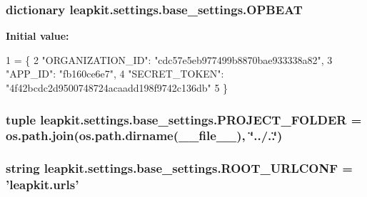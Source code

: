 \hypertarget{namespaceleapkit_1_1settings_1_1base__settings_a741fb2801950e7f83ca6019995d8f4c7}{
\subsubsection[{O\-P\-B\-E\-A\-T}]{\setlength{\rightskip}{0pt plus 5cm}dictionary leapkit.\-settings.\-base\-\_\-settings.\-O\-P\-B\-E\-A\-T}}\label{namespaceleapkit_1_1settings_1_1base__settings_a741fb2801950e7f83ca6019995d8f4c7}
{\bfseries Initial value\-:}
\begin{DoxyCode}
1 = \{
2     \textcolor{stringliteral}{"ORGANIZATION\_ID"}: \textcolor{stringliteral}{"cdc57e5eb977499b8870bae933338a82"},
3     \textcolor{stringliteral}{"APP\_ID"}: \textcolor{stringliteral}{"fb160ce6e7"},
4     \textcolor{stringliteral}{"SECRET\_TOKEN"}: \textcolor{stringliteral}{"4f42bcdc2d9500748724acaadd198f9742c136db"}
5 \}
\end{DoxyCode}
\hypertarget{namespaceleapkit_1_1settings_1_1base__settings_a608118bf02a6f09810f065178ee998a3}{
\subsubsection[{P\-R\-O\-J\-E\-C\-T\-\_\-\-F\-O\-L\-D\-E\-R}]{\setlength{\rightskip}{0pt plus 5cm}tuple leapkit.\-settings.\-base\-\_\-settings.\-P\-R\-O\-J\-E\-C\-T\-\_\-\-F\-O\-L\-D\-E\-R = os.\-path.\-join(os.\-path.\-dirname(\-\_\-\-\_\-file\-\_\-\-\_\-), \char`\"{}../..\char`\"{})}}\label{namespaceleapkit_1_1settings_1_1base__settings_a608118bf02a6f09810f065178ee998a3}
\hypertarget{namespaceleapkit_1_1settings_1_1base__settings_a4e52aaa716d30d44e7277e11d58c639e}{
\subsubsection[{R\-O\-O\-T\-\_\-\-U\-R\-L\-C\-O\-N\-F}]{\setlength{\rightskip}{0pt plus 5cm}string leapkit.\-settings.\-base\-\_\-settings.\-R\-O\-O\-T\-\_\-\-U\-R\-L\-C\-O\-N\-F = 'leapkit.\-urls'}}\label{namespaceleapkit_1_1settings_1_1base__settings_a4e52aaa716d30d44e7277e11d58c639e}
